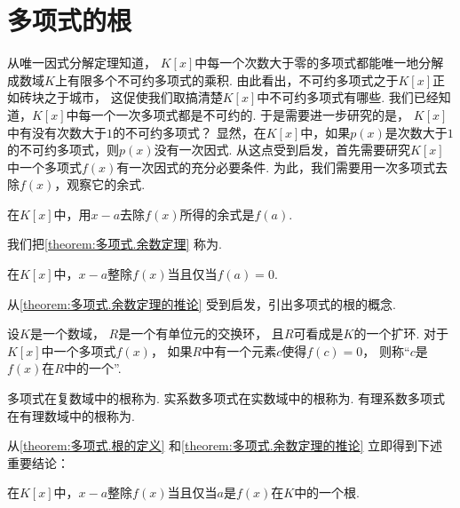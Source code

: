 \section{多项式的根}
从唯一因式分解定理知道，
\(K[x]\)中每一个次数大于零的多项式都能唯一地分解成数域\(K\)上有限多个不可约多项式的乘积.
由此看出，不可约多项式之于\(K[x]\)正如砖块之于城市，
这促使我们取搞清楚\(K[x]\)中不可约多项式有哪些.
我们已经知道，\(K[x]\)中每一个一次多项式都是不可约的.
于是需要进一步研究的是，
\(K[x]\)中有没有次数大于\(1\)的不可约多项式？
显然，在\(K[x]\)中，如果\(p(x)\)是次数大于\(1\)的不可约多项式，则\(p(x)\)没有一次因式.
从这点受到启发，首先需要研究\(K[x]\)中一个多项式\(f(x)\)有一次因式的充分必要条件.
为此，我们需要用一次多项式去除\(f(x)\)，观察它的余式.

\begin{theorem}\label{theorem:多项式.余数定理}
在\(K[x]\)中，用\(x-a\)去除\(f(x)\)所得的余式是\(f(a)\).
\end{theorem}

我们把\cref{theorem:多项式.余数定理} 称为.

\begin{corollary}\label{theorem:多项式.余数定理的推论}
在\(K[x]\)中，\(x-a\)整除\(f(x)\)当且仅当\(f(a)=0\).
\end{corollary}

从\cref{theorem:多项式.余数定理的推论} 受到启发，引出多项式的根的概念.

\begin{definition}\label{theorem:多项式.根的定义}
设\(K\)是一个数域，
\(R\)是一个有单位元的交换环，
且\(R\)可看成是\(K\)的一个扩环.
对于\(K[x]\)中一个多项式\(f(x)\)，
如果\(R\)中有一个元素\(c\)使得\(f(c)=0\)，
则称“\(c\)是\(f(x)\)在\(R\)中的一个”.
\end{definition}

多项式在复数域中的根称为.
实系数多项式在实数域中的根称为.
有理系数多项式在有理数域中的根称为.

从\cref{theorem:多项式.根的定义} 和\cref{theorem:多项式.余数定理的推论} 立即得到下述重要结论：
\begin{theorem}\label{theorem:多项式.贝祖定理}
在\(K[x]\)中，\(x-a\)整除\(f(x)\)当且仅当\(a\)是\(f(x)\)在\(K\)中的一个根.
\end{theorem}

